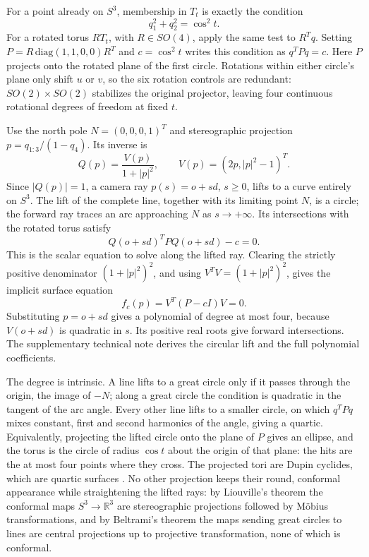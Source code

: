 \documentclass{jcgt}
\begin{document}
For a point already on \(S^3\), membership in \(T_t\) is exactly the
condition \[
q_1^2+q_2^2=\cos^2t.
\] For a rotated torus \(RT_t\), with \(R\in SO(4)\), apply the same
test to \(R^Tq\). Setting \(P=R\,\mathrm{diag}(1,1,0,0)R^T\) and
\(c=\cos^2t\) writes this condition as \(q^TPq=c\). Here \(P\) projects
onto the rotated plane of the first circle. Rotations within either
circle's plane only shift \(u\) or \(v\), so the six rotation controls
are redundant: \(SO(2)\times SO(2)\) stabilizes the original projector,
leaving four continuous rotational degrees of freedom at fixed \(t\).

Use the north pole \(N=(0,0,0,1)^T\) and stereographic projection
\(p=q_{1:3}/(1-q_4)\). Its inverse is \[
Q(p)=\frac{V(p)}{1+|p|^2},\qquad V(p)=(2p,|p|^2-1)^T.
\] Since \(|Q(p)|=1\), a camera ray \(p(s)=o+sd\), \(s\geq0\), lifts to
a curve entirely on \(S^3\). The lift of the complete line, together
with its limiting point \(N\), is a circle; the forward ray traces an
arc approaching \(N\) as \(s\to+\infty\). Its intersections with the
rotated torus satisfy \[
Q(o+sd)^TPQ(o+sd)-c=0.
\] This is the scalar equation to solve along the lifted ray. Clearing
the strictly positive denominator \((1+|p|^2)^2\), and using
\(V^TV=(1+|p|^2)^2\), gives the implicit surface equation \[
f_c(p)=V^T(P-cI)V=0.
\] Substituting \(p=o+sd\) gives a polynomial of degree at most four,
because \(V(o+sd)\) is quadratic in \(s\). Its positive real roots give
forward intersections. The supplementary technical note derives the
circular lift and the full polynomial coefficients.

The degree is intrinsic. A line lifts to a great circle only if it
passes through the origin, the image of \(-N\); along a great circle the
condition is quadratic in the tangent of the arc angle. Every other line
lifts to a smaller circle, on which \(q^TPq\) mixes constant, first and
second harmonics of the angle, giving a quartic. Equivalently,
projecting the lifted circle onto the plane of \(P\) gives an ellipse,
and the torus is the circle of radius \(\cos t\) about the origin of
that plane: the hits are the at most four points where they cross. The
projected tori are Dupin cyclides, which are quartic surfaces
\citep{banchoff1990}. No other projection keeps their round, conformal
appearance while straightening the lifted rays: by Liouville's theorem
the conformal maps \(S^3\to\mathbb R^3\) are stereographic projections
followed by Möbius transformations, and by Beltrami's theorem the maps
sending great circles to lines are central projections up to projective
transformation, none of which is conformal.
\end{document}
